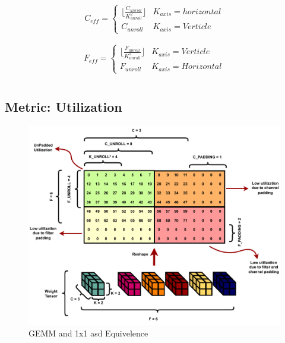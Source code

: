 \begin{align}
    \begin{gathered}
        C_{eff} = \begin{cases} \lfloor \frac{C_{unroll}}{K^{2}_{unroll}} \rfloor & K_{axis} = horizontal\\ C_{unroll} & K_{axis} = Verticle\end{cases} \\
        \end{gathered}
    \label{math:effective_unroll_factors_c}
\end{align}
\begin{align}
    \begin{gathered}
        F_{eff} = \begin{cases} \lfloor \frac{F_{unroll}}{K^{2}_{unroll}} \rfloor & K_{axis} = Verticle\\ F_{unroll} & K_{axis} = Horizontal\end{cases} \\
        \end{gathered}
    \label{math:effective_unroll_factors_f}
\end{align}

\subsection{Metric: Utilization}
\label{chap:dataflow_dse:exploring:tempo_model:utilization}

\begin{figure}[]
    \centering
    \includegraphics[scale=0.45]{fig/Lasso_ilus.pdf}
    \caption{\ac{GEMM} and 1x1 asd Equivelence}
    \label{fig:tempo_model}
\end{figure}

